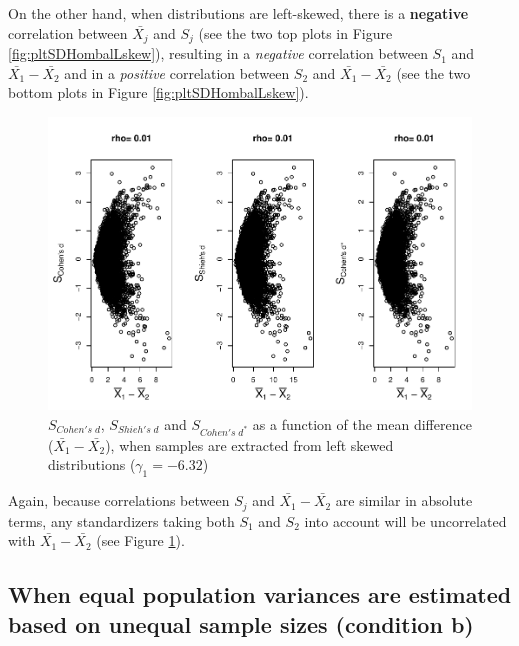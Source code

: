 \documentclass[
  english,
  man,mask,floatsintext]{apa6}
\begin{document}
On the other hand, when distributions are left-skewed, there is a \textbf{negative} correlation between \(\bar{X_j}\) and \(S_j\) (see the two top plots in Figure \ref{fig:pltSDHombalLskew}), resulting in a \emph{negative} correlation between \(S_1\) and \(\bar{X_1}-\bar{X_2}\) and in a \emph{positive} correlation between \(S_2\) and \(\bar{X_1}-\bar{X_2}\) (see the two bottom plots in Figure \ref{fig:pltSDHombalLskew}).

\begin{figure}
\centering
\includegraphics{Correlation_files/figure-latex/pltStdzrHombalLskew-1.pdf}
\caption{\label{fig:pltStdzrHombalLskew}\(S_{Cohen's \; d}\), \(S_{Shieh's \; d}\) and \(S_{Cohen's \; d^*}\) as a function of the mean difference (\(\bar{X_1}-\bar{X_2}\)), when samples are extracted from left skewed distributions (\(\gamma_1 = -6.32\))}
\end{figure}

Again, because correlations between \(S_j\) and \(\bar{X_1}-\bar{X_2}\) are similar in absolute terms, any standardizers taking both \(S_1\) and \(S_2\) into account will be uncorrelated with \(\bar{X_1}-\bar{X_2}\) (see Figure \ref{fig:pltStdzrHombalLskew}).

\hypertarget{when-equal-population-variances-are-estimated-based-on-unequal-sample-sizes-condition-b}{%
\subsection{When equal population variances are estimated based on unequal sample sizes (condition b)}\label{when-equal-population-variances-are-estimated-based-on-unequal-sample-sizes-condition-b}}
\end{document}
